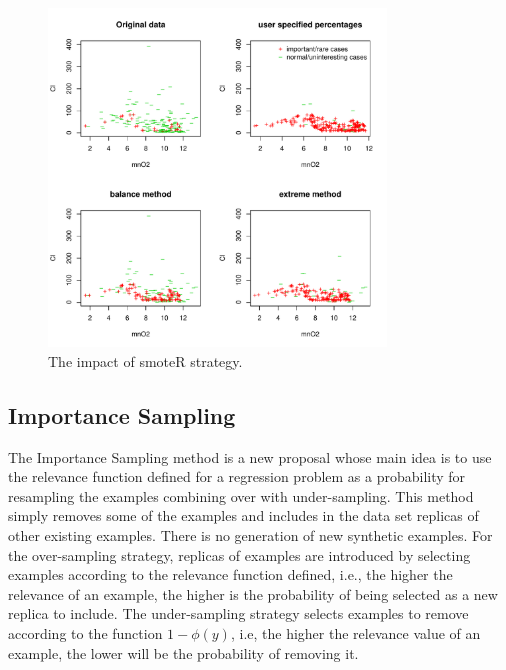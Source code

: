 \documentclass[10pt,a4paper]{article}\usepackage[]{graphicx}\usepackage[]{color}
\newenvironment{knitrout}{}{} %
\begin{document}
\begin{knitrout}\footnotesize
{}\color{fgcolor}\begin{figure}

{\centering \includegraphics[width=0.8\textwidth]{figures/UBL-smoteR_fig2-1} 

}

\caption[The impact of smoteR strategy]{The impact of smoteR strategy.}\label{fig:smoteR_fig2}
\end{figure}


\end{knitrout}



\subsection{Importance Sampling}\label{sec:ISRegress}

The Importance Sampling method is a new proposal whose main idea is to use the relevance function defined for a regression problem as a probability for resampling the examples combining over with under-sampling. This method simply removes some of the examples and includes in the data set replicas of other existing examples. There is no generation of new synthetic examples. For the over-sampling strategy, replicas of examples are introduced by selecting examples according to the relevance function defined, i.e., the higher the relevance of an example, the higher is the probability of being selected as a new replica to include. The under-sampling strategy selects examples to remove according to the function $1-\phi(y)$, i.e, the higher the relevance value of an example, the lower will be the probability of removing it.
\end{document}
